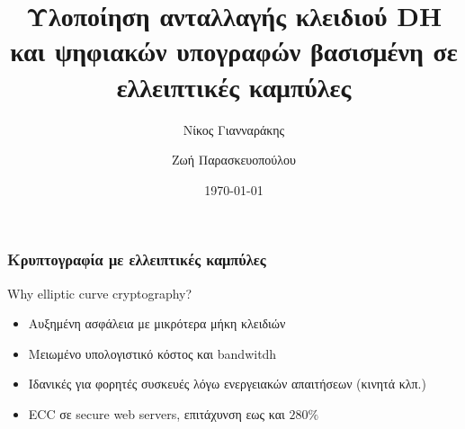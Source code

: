 \documentclass{beamer}
\title[Elliptic Curve Cryptography]{Υλοποίηση ανταλλαγής κλειδιού DH και ψηφιακών υπογραφών βασισμένη σε ελλειπτικές καμπύλες}
\author{Νίκος Γιανναράκης \\ \and Ζωή Παρασκευοπούλου}
\institute[]
{
Σχολή Ηλεκτρολόγων Μηχανικών και Μηχανικών Υπολογιστών\\
Εθνικό Μετσόβιο Πολυτεχνείο
}
\date{\today}
\begin{document}
\begin{frame}
\titlepage
\end{frame}
\begin{frame}
\frametitle{Κρυπτογραφία με ελλειπτικές καμπύλες}
\begin{block}
{Why elliptic curve cryptography?}
\begin{itemize}
\item Αυξημένη ασφάλεια με μικρότερα μήκη κλειδιών
\item Μειωμένο υπολογιστικό κόστος και bandwitdh
\item Ιδανικές για φορητές συσκευές λόγω ενεργειακών απαιτήσεων (κινητά κλπ.)
\item ECC σε secure web servers, επιτάχυνση εως και $280\%$ \cite{SUN}
\end{itemize}
\end{block}
\end{frame}
\end{document}
